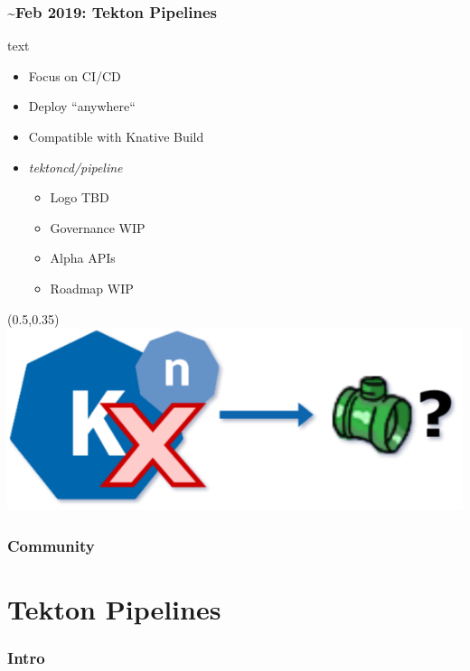\documentclass[aspectratio=169,11pt,hyperref={colorlinks=true}]{beamer}
\begin{document}
\begin{lblackrwhiteframe}
\begin{lblackrwhiteframe}
  \frametitle{\textasciitilde Feb 2019: Tekton Pipelines}
  \large
  \begin{beamercolorbox}[wd=0.3\paperwidth]{text}
    \begin{itemize}
      \item Focus on CI/CD
      \item Deploy ``anywhere``
      \item Compatible with Knative Build
    \end{itemize}
    \begin{itemize}
      \item {\em tektoncd/pipeline}
      \begin{itemize}
        \item Logo TBD
        \item Governance WIP
        \item Alpha APIs
        \item Roadmap WIP
      \end{itemize}
    \end{itemize}
  \end{beamercolorbox}%
  \begin{textblock*}{0.5\paperwidth}(0.5\paperwidth,0.35\paperheight)
    \centering
    \includegraphics[width=0.35\paperwidth]{img/tekton_not_knative.png}
  \end{textblock*}
\end{lblackrwhiteframe}

\begin{grayframe}
  \frametitle{Community}
\end{grayframe}

\section{Tekton Pipelines}

\begin{grayframe}
  \frametitle{Intro}
\end{grayframe}


\end{lblackrwhiteframe}
\end{document}
